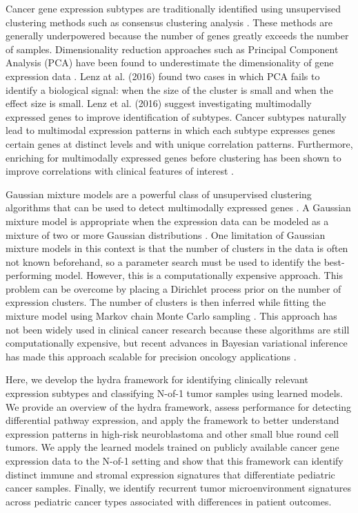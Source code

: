 \documentclass[10pt,letterpaper]{article}
\begin{document}
Cancer gene expression subtypes are traditionally identified using unsupervised clustering methods such as consensus clustering analysis \cite{oyeladeClusteringAlgorithmsTheir2016,johnM3CMonteCarlo2018,wilkersonConsensusClusterPlusClassDiscovery2010a}. These methods are generally underpowered because the number of genes greatly exceeds the number of samples. Dimensionality reduction approaches such as Principal Component Analysis (PCA) have been found to underestimate the dimensionality of gene expression data \cite{lenzPrincipalComponentsAnalysis2016}. Lenz at al. (2016) found two cases in which PCA fails to identify a biological signal: when the size of the cluster is small and when the effect size is small. Lenz et al. (2016) suggest investigating multimodally expressed genes to improve identification of subtypes. Cancer subtypes naturally lead to multimodal expression patterns in which each subtype expresses genes certain genes at distinct levels and with unique correlation patterns. Furthermore, enriching for multimodally expressed genes before clustering has been shown to improve correlations with clinical features of interest \cite{yiliMultimodalityCriterionFeature2005}.

Gaussian mixture models are a powerful class of unsupervised clustering algorithms that can be used to detect multimodally expressed genes \cite{ghoshMixtureModelsAssessing2004,dahlModelBasedClusteringExpression2006,kimVariableSelectionClustering2006}. A Gaussian mixture model is appropriate when the expression data can be modeled as a mixture of two or more Gaussian distributions \cite{gelmanBayesianDataAnalysis2013}. One limitation of Gaussian mixture models in this context is that the number of clusters in the data is often not known beforehand, so a parameter search must be used to identify the best-performing model. However, this is a computationally expensive approach. This problem can be overcome by placing a Dirichlet process prior on the number of expression clusters. The number of clusters is then inferred while fitting the mixture model using Markov chain Monte Carlo sampling \cite{gelmanBayesianDataAnalysis2013}. This approach has not been widely used in clinical cancer research because these algorithms are still computationally expensive, but recent advances in Bayesian variational inference has made this approach scalable for precision oncology applications \cite{thallBayesianNonparametricStatistics2017}. 

Here, we develop the hydra framework for identifying clinically relevant expression subtypes and classifying N-of-1 tumor samples using learned models. We provide an overview of the hydra framework, assess performance for detecting differential pathway expression, and apply the framework to better understand expression patterns in high-risk neuroblastoma and other small blue round cell tumors. We apply the learned models trained on publicly available cancer gene expression data to the N-of-1 setting and show that this framework can identify distinct immune and stromal expression signatures that differentiate pediatric cancer samples. Finally, we identify recurrent tumor microenvironment signatures across pediatric cancer types associated with differences in patient outcomes.
  
\end{document}
